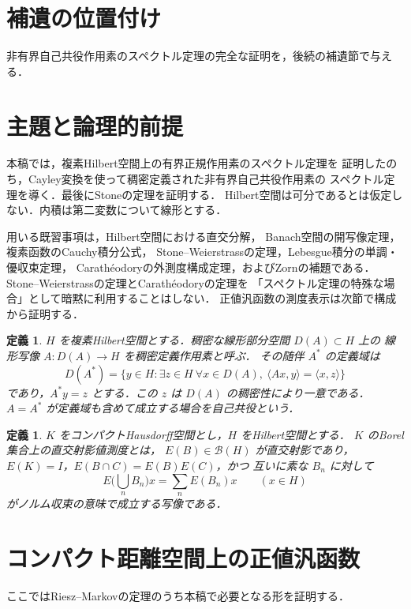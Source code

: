 \documentclass[a5paper,10pt,onecolumn]{jsarticle}
\theoremstyle{mathnotetheorem}
\newtheorem{definition}[theorem]{定義}
\begin{document}
\section{補遺の位置付け}
非有界自己共役作用素のスペクトル定理の完全な証明を，後続の補遺節で与える．

\section{主題と論理的前提}
本稿では，複素Hilbert空間上の有界正規作用素のスペクトル定理を
証明したのち，Cayley変換を使って稠密定義された非有界自己共役作用素の
スペクトル定理を導く．最後にStoneの定理を証明する．
Hilbert空間は可分であるとは仮定しない．内積は第二変数について線形とする．

用いる既習事項は，Hilbert空間における直交分解，
Banach空間の開写像定理，複素函数のCauchy積分公式，
Stone--Weierstrassの定理，Lebesgue積分の単調・優収束定理，
Carath\'eodoryの外測度構成定理，およびZornの補題である．
Stone--Weierstrassの定理とCarath\'eodoryの定理を
「スペクトル定理の特殊な場合」として暗黙に利用することはしない．
正値汎函数の測度表示は次節で構成から証明する．

\begin{definition}
$H$ を複素Hilbert空間とする．稠密な線形部分空間 $D(A)\subset H$ 上の
線形写像 $A:D(A)\to H$ を稠密定義作用素と呼ぶ．
その随伴 $A^*$ の定義域は
\[
 D(A^*)=\{y\in H:\exists z\in H\ \forall x\in D(A),
                 \ \langle Ax,y\rangle=\langle x,z\rangle\}
\]
であり，$A^*y=z$ とする．この $z$ は $D(A)$ の稠密性により一意である．
$A=A^*$ が定義域も含めて成立する場合を\emph{自己共役}という．
\end{definition}

\begin{definition}
$K$ をコンパクトHausdorff空間とし，$H$ をHilbert空間とする．
$K$ のBorel集合上の\emph{直交射影値測度}とは，
$E(B)\in\mathcal B(H)$ が直交射影であり，
$E(K)=I$，$E(B\cap C)=E(B)E(C)$，かつ
互いに素な $B_n$ に対して
\[
 E\bigl(\textstyle\bigcup_n B_n\bigr)x
   =\sum_nE(B_n)x \qquad(x\in H)
\]
がノルム収束の意味で成立する写像である．
\end{definition}

\section{コンパクト距離空間上の正値汎函数}
ここではRiesz--Markovの定理のうち本稿で必要となる形を証明する．
\end{document}
